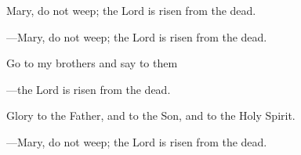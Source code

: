 \responsory

\begin{hangpar}
Mary, do not weep; the Lord is risen from the dead.

{\color{red}---\thinspace}Mary, do not weep; the Lord is risen from the dead.

\medskip Go to my brothers and say to them

{\color{red}---\thinspace}the Lord is risen from the dead.

\medskip Glory to the Father, and to the Son, and to the Holy Spirit.

{\color{red}---\thinspace}Mary, do not weep; the Lord is risen from the dead.
\end{hangpar}